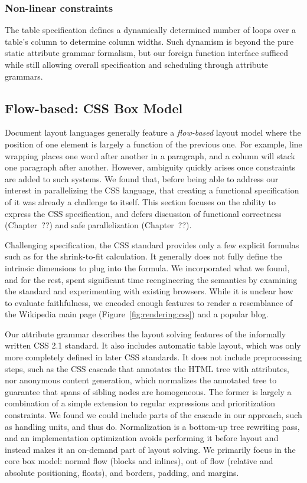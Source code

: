 \subsubsection{Non-linear constraints}
The table specification defines a dynamically determined number of loops over a table's column to determine column widths. Such dynamism is beyond the pure static attribute grammar formalism, but our foreign function interface sufficed while still allowing overall specification and scheduling through attribute grammars.

\subsection{Flow-based: CSS Box Model}
Document layout languages generally feature a \emph{flow-based} layout model where the position of one element is largely a function of the previous one. For example, line wrapping places one word after another in a paragraph, and a column will stack one paragraph after another. However, ambiguity quickly arises once constraints are added to such systems. We found that, before being able to address our interest in parallelizing the CSS language, that creating a functional specification of it was already a challenge to itself.  This section focuses on the ability to express the CSS specification, and defers discussion of functional correctness (Chapter~??) and safe parallelization (Chapter~??).

Challenging specification, the CSS standard provides only a few explicit formulas such as   for the shrink-to-fit calculation. It generally does not fully define the intrinsic dimensions to plug into the formula. We incorporated what we found, and for the rest, spent significant time reengineering the semantics by examining the standard and experimenting with existing browsers. While it is unclear how to evaluate faithfulness, we encoded enough features to render a resemblance of the Wikipedia main page (Figure~\ref{fig:rendering:css}) and a popular blog.

Our attribute grammar describes the layout solving features of the informally written CSS 2.1 standard. It also includes automatic table layout, which was only more completely defined in later CSS standards. It does not include preprocessing steps, such as the CSS cascade that annotates the HTML tree with attributes, nor anonymous content generation, which normalizes the annotated tree to guarantee that spans of sibling nodes are homogeneous. The former is largely a combination of a simple extension to regular expressions and prioritization constraints. We found we could include parts of the cascade in our approach, such as handling units, and thus do.  Normalization is a bottom-up tree rewriting pass, and an implementation optimization avoids performing it before layout and instead makes it an on-demand part of layout solving. We primarily focus in the core box model: normal flow (blocks and inlines), out of flow (relative and absolute positioning, floats), and borders, padding, and margins.

